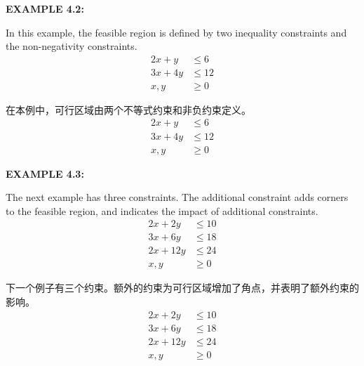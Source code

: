 \bigskip
\noindent\textbf{EXAMPLE 4.2:}
\begin{original}
In this example, the feasible region is defined by two inequality constraints and the non-negativity constraints.
\[
\begin{aligned}
2x + y &\le 6 \\
3x + 4y &\le 12 \\
x, y &\ge 0
\end{aligned}
\]
\end{original}
\begin{translation}
在本例中，可行区域由两个不等式约束和非负约束定义。
\[
\begin{aligned}
2x + y &\le 6 \\
3x + 4y &\le 12 \\
x, y &\ge 0
\end{aligned}
\]
\end{translation}

\bigskip
\noindent\textbf{EXAMPLE 4.3:}
\begin{original}
The next example has three constraints. The additional constraint adds corners to the feasible region, and indicates the impact of additional constraints.
\[
\begin{aligned}
2x + 2y &\le 10 \\
3x + 6y &\le 18 \\
2x + 12y &\le 24 \\
x, y &\ge 0
\end{aligned}
\]
\end{original}
\begin{translation}
下一个例子有三个约束。额外的约束为可行区域增加了角点，并表明了额外约束的影响。
\[
\begin{aligned}
2x + 2y &\le 10 \\
3x + 6y &\le 18 \\
2x + 12y &\le 24 \\
x, y &\ge 0
\end{aligned}
\]
\end{translation}

